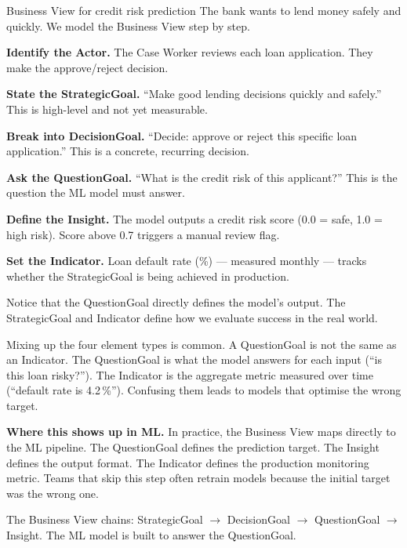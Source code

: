 \documentclass[a4paper,11pt]{article}
\begin{document}
\begin{worked}{Business View for credit risk prediction}
The bank wants to lend money safely and quickly.
We model the Business View step by step.
\begin{steps}
  \item \textbf{Identify the Actor.}
        The Case Worker reviews each loan application.
        They make the approve/reject decision.
  \item \textbf{State the StrategicGoal.}
        ``Make good lending decisions quickly and safely.''
        This is high-level and not yet measurable.
  \item \textbf{Break into DecisionGoal.}
        ``Decide: approve or reject this specific loan application.''
        This is a concrete, recurring decision.
  \item \textbf{Ask the QuestionGoal.}
        ``What is the credit risk of this applicant?''
        This is the question the ML model must answer.
  \item \textbf{Define the Insight.}
        The model outputs a credit risk score (0.0 = safe, 1.0 = high risk).
        Score above 0.7 triggers a manual review flag.
  \item \textbf{Set the Indicator.}
        Loan default rate (\%) --- measured monthly --- tracks whether the
        StrategicGoal is being achieved in production.
\end{steps}
Notice that the QuestionGoal directly defines the model's output.
The StrategicGoal and Indicator define how we evaluate success in the real world.
\end{worked}

\begin{watchout}
Mixing up the four element types is common.
A QuestionGoal is not the same as an Indicator.
The QuestionGoal is what the model answers for each input (``is this loan risky?'').
The Indicator is the aggregate metric measured over time (``default rate is 4.2\,\%'').
Confusing them leads to models that optimise the wrong target.
\end{watchout}

\noindent\textbf{Where this shows up in ML.}
In practice, the Business View maps directly to the ML pipeline.
The QuestionGoal defines the prediction target.
The Insight defines the output format.
The Indicator defines the production monitoring metric.
Teams that skip this step often retrain models because the initial target
was the wrong one.

\begin{keytake}
The Business View chains: StrategicGoal $\to$ DecisionGoal $\to$ QuestionGoal $\to$
Insight. The ML model is built to answer the QuestionGoal.
\end{keytake}
\end{document}
